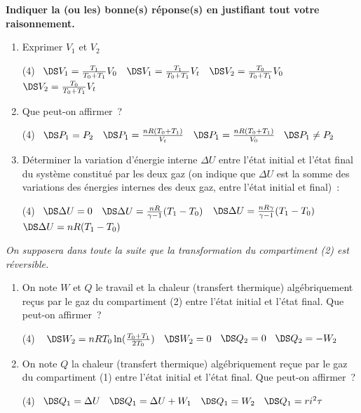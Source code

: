 \documentclass[a4paper, 12pt, garamond]{book}
\begin{document}
\begin{center}

	\textbf{Indiquer la (ou les) bonne(s) réponse(s) en justifiant tout
		votre raisonnement.}

\end{center}

\begin{enumerate}
	\item Exprimer \(V_1\) et \(V_2\)
	      \begin{tasks}[label=\protect\fbox{\Alph*}](4)
		      \task~$\DS V_1 = \frac{T_1}{T_0+T_1}V_0$
		      \task~$\DS V_1 = \frac{T_1}{T_0+T_1}V_t$
		      \task~$\DS V_2 = \frac{T_0}{T_0+T_1}V_0$
		      \task~$\DS V_2 = \frac{T_0}{T_0+T_1}V_t$
	      \end{tasks}
	\item Que peut-on affirmer~?
	      \begin{tasks}[label=\protect\fbox{\Alph*}](4)
		      \task~$\DS P_1 = P_2$
		      \task~$\DS P_1 = \frac{nR(T_0 + T_1)}{V_t}$
		      \task~$\DS P_1 = \frac{nR(T_0 + T_1)}{V_0}$
		      \task~$\DS P_1 \neq P_2$
	      \end{tasks}
	\item Déterminer la variation d'énergie interne \(\Delta U\) entre l'état
	      initial et l'état final du système constitué par les deux gaz (on
	      indique que \(\Delta U\) est la somme des variations des énergies
	      internes des deux gaz, entre l'état initial et final)~:
	      \begin{tasks}[label=\protect\fbox{\Alph*}](4)
		      \task~$\DS \Delta U = 0$
		      \task~{\footnotesize$\DS \Delta U = \frac{nR}{\gamma -1}(T_1 - T_0)$}
		      \task~{\footnotesize$\DS \Delta U = \frac{nR\gamma}{\gamma -1}(T_1 - T_0)$}
		      \task~$\DS \Delta U = nR(T_1 - T_0)$
	      \end{tasks}
\end{enumerate}

\emph{On supposera dans toute la suite que la transformation du
	compartiment (2) est réversible.}

\begin{enumerate}[resume]
	\item On note \(W\) et \(Q\) le travail et la chaleur (transfert thermique)
	      algébriquement reçus par le gaz du compartiment (2) entre l'état
	      initial et l'état final. Que peut-on affirmer~?
	      \begin{tasks}[label=\protect\fbox{\Alph*}](4)
		      \task~{\footnotesize
		      $\DS W_2 = nRT_0\ln(\frac{T_0 + T_1}{2T_0})$}
		      \task~$\DS W_2 = 0$
		      \task~$\DS Q_2 = 0$
		      \task~$\DS Q_2 = -W_2$
	      \end{tasks}
	\item On note \(Q\) la chaleur (transfert thermique) algébriquement reçue par
	      le gaz du compartiment (1) entre l'état initial et l'état final. Que
	      peut-on affirmer~?
	      \begin{tasks}[label=\protect\fbox{\Alph*}](4)
		      \task~$\DS Q_1 = \Delta U$
		      \task~$\DS Q_1 = \Delta U + W_1$
		      \task~$\DS Q_1 = W_2$
		      \task~$\DS Q_1 = ri^2\tau$
	      \end{tasks}
\end{enumerate}
\end{document}
